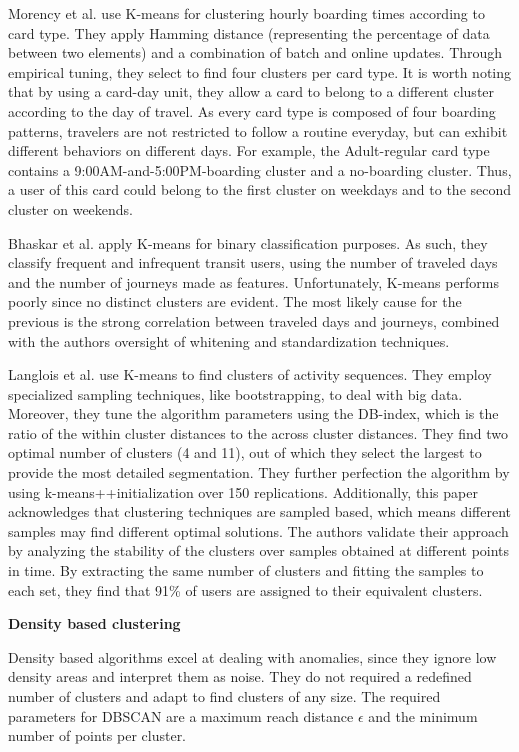 \documentclass{article}
\begin{document}
Morency et al. use K-means for clustering hourly boarding times according to card type. They apply Hamming distance (representing the percentage of data between two elements) and a combination of batch and online updates. Through empirical tuning, they select to find four clusters per card type. It is worth noting that by using a card-day unit, they allow a card to belong to a different cluster according to the day of travel. As every card type is composed of four boarding patterns, travelers are not restricted to follow a routine everyday, but can exhibit different behaviors on different days. For example, the Adult-regular card type contains a 9:00AM-and-5:00PM-boarding cluster and a no-boarding cluster. Thus, a user of this card could belong to the first cluster on weekdays and to the second cluster on weekends.  \cite{morency2007measuring}

Bhaskar et al. apply K-means for binary classification purposes. As such, they classify frequent and infrequent transit users, using the number of traveled days and the number of journeys made as features. Unfortunately, K-means performs poorly since no distinct clusters are evident. The most likely cause for the previous is the strong correlation between traveled days and journeys, combined with the authors oversight of whitening and standardization techniques. \cite{bhaskar2015passenger}

Langlois et al. use K-means to find clusters of activity sequences. They employ specialized sampling techniques, like bootstrapping, to deal with big data.  Moreover, they tune the algorithm parameters using the DB-index, which is the ratio of the within cluster distances to the across cluster distances. They find two optimal number of clusters (4 and 11), out of which they select the largest to provide the most detailed segmentation. They further perfection the algorithm by using k-means++initialization over 150 replications. Additionally, this paper acknowledges that clustering techniques are sampled based, which means different samples may find different optimal solutions. The authors validate their approach by analyzing the stability of the clusters over samples obtained at different points in time. By extracting the same number of clusters and fitting the samples to each set, they find that 91\% of users are assigned to their equivalent clusters. \cite{langlois2016inferring}

\textbf{Density based clustering}

Density based algorithms excel at dealing with anomalies, since they ignore low density areas and interpret them as noise. They do not required a redefined number of clusters and adapt to find clusters of any size. The required parameters for DBSCAN are a maximum reach distance $\epsilon$ and the minimum number of points per cluster.
\end{document}
